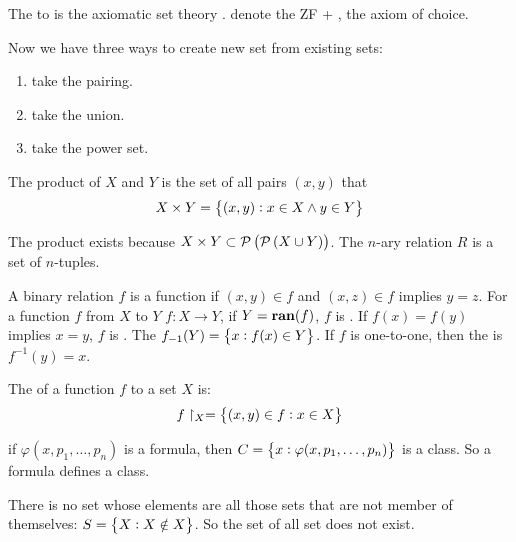 The  to  is the  axiomatic set theory .  denote the ZF + , the axiom of choice.

Now we have three ways to create new set from existing sets:
\begin{enumerate}
    \item take the pairing.
    \item take the union.
    \item take the power set.
\end{enumerate}

\begin{definition}
    The product of $X$ and $Y$ is the set of all pairs $(x,y)$ that 
    \begin{equation}
        X \times Y = \set{(x,y): x \in X \wedge y \in Y }
    \end{equation}
    
    The product exists because $X \times Y \subset \mathcal{P}\left(  \mathcal{P}\left( X \cup Y \right) \right)$. The $n$-ary relation $R$ is a set of $n$-tuples.
\end{definition}

\begin{definition}
    A binary relation $f$ is a function if $(x,y) \in f$ and $(x, z) \in f$ implies $y = z$. For a function $f$ from $X$ to $Y$ $f : X \rightarrow Y$, if $Y = \mathbf{ran}(f)$, $f$ is . If $f(x) = f(y)$ implies $x=y$, $f$ is . The  $f_{-1} (Y) = \set{x: f(x) \in Y}$. If $f$ is one-to-one, then the  is $f^{-1} (y) = x$.
\end{definition}

\begin{definition}
    The  of a function $f$ to a set $X$ is:
    \begin{equation}
        f\restriction_X = \set{(x,y) \in f : x \in X}
    \end{equation}
\end{definition}


\begin{definition}
    if $\varphi(x, p_1, \dots, p_n)$ is a formula, then $C = \set{x: \varphi(x, p_1, \dots, p_n)}$ is a class. So a formula defines a class.
\end{definition}

\begin{theorem}
    There is no set whose elements are all those sets that are not member of themselves: $S = \set{X : X \notin X}$. So the set of all set does not exist.
\end{theorem}


